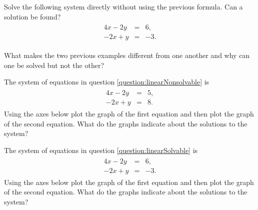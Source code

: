 \begin{problem}
\vfill
\clearpage

\item Solve the following system directly without using the previous formula. Can a solution be found? \label{question:linearSolvable}
\begin{eqnarray*}
  \begin{array}{lcl}
     4x - 2y & = & 6, \\
    -2x + y & = & -3.
  \end{array}
\end{eqnarray*}

\vfill

\item What makes the two previous examples different from one another and why can one be solved but not the other?
  \vspace{4em}


\clearpage

\item The system of equations in question \ref{question:linearNonsolvable} is
\begin{eqnarray*}
  \begin{array}{lcl}
     4x - 2y & = & 5, \\
    -2x + y & = & 8.
  \end{array}
\end{eqnarray*}
Using the axes below plot the graph of the first equation and then plot the graph of the second equation.
What do the graphs indicate about the solutions to the system?


\clearpage

\item The system of equations in question \ref{question:linearSolvable} is
\begin{eqnarray*}
  \begin{array}{lcl}
     4x - 2y & = & 6, \\
    -2x + y & = & -3.
  \end{array}
\end{eqnarray*}
Using the axes below plot the graph of the first equation and then plot the graph of the second equation.
What do the graphs indicate about the solutions to the system?


\end{problem}
